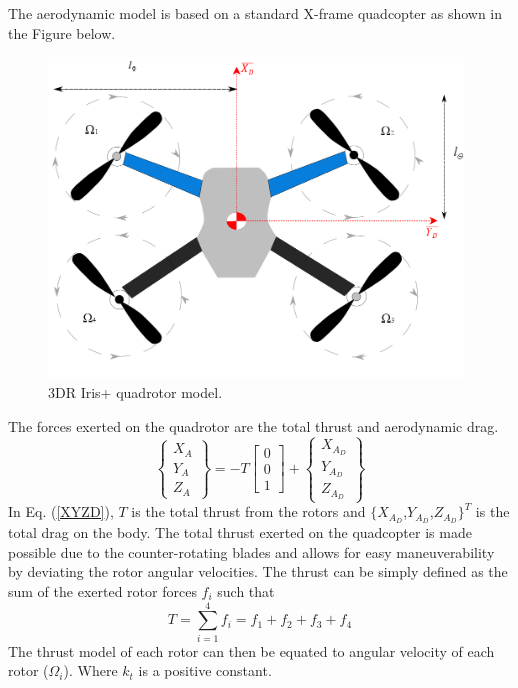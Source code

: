 The aerodynamic model is based on a standard X-frame quadcopter as shown in the Figure below.
\begin{figure}[H]
\centerline{               
\includegraphics[width=11cm]
{Figures/Iris+QuadcopterDrawing.png}}
\caption{3DR Iris+ quadrotor model.}
\label{iris+}
\end{figure}
The forces exerted on the quadrotor are the total thrust and aerodynamic drag. 
\begin{equation}
\begin{Bmatrix}
X_{A}\\Y_{A}\\Z_{A}
\end{Bmatrix}= -T\begin{bmatrix}
0 \\ 0 \\ 1
\end{bmatrix} + \begin{Bmatrix}
X_{A_{D}} \\ Y_{A_{D}} \\ Z_{A_{D}}
\end{Bmatrix}
\label{XYZD}
\end{equation}
In Eq. (\ref{XYZD}), $T$ is the total thrust from the rotors and $\{X_{A_{D}}$,$Y_{A_{D}}$,$Z_{A_{D}}\}^{T}$ is the  total drag on the body. The total thrust exerted on the quadcopter is made possible due to the counter-rotating blades and allows for easy maneuverability by deviating the rotor angular velocities. The thrust can be simply defined as the sum of the exerted rotor forces $f_{i}$ such that
\begin{equation}
T = \sum\limits_{i=1}^4 f_{i} = f_{1}+f_{2}+f_{3}+f_{4}
\label{Tsimple}
\end{equation}
The thrust model of each rotor can then be equated to angular velocity of each rotor ($\Omega_i$). Where $k_t$ is a positive constant.
